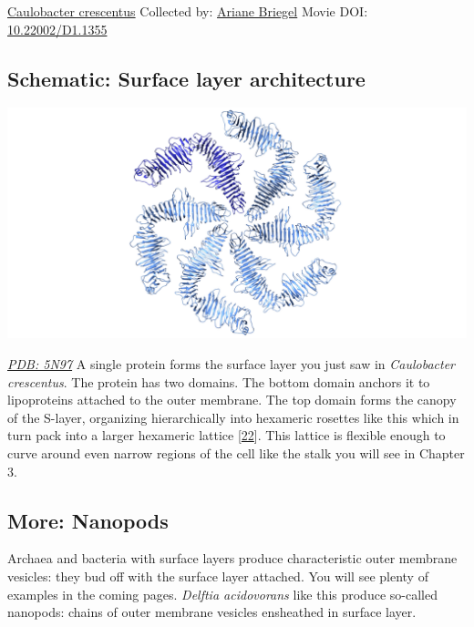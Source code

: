 \documentclass[]{tufte-book}
\begin{document}
\hypertarget{htmlwidget-324191a02fc7c81bfc07}{}

\label{fig:2-6}\protect\hyperlink{tree}{Caulobacter crescentus} Collected by: \protect\hyperlink{ariane_briegel}{Ariane Briegel} Movie DOI: \href{https://doi.org/10.22002/D1.1355}{10.22002/D1.1355}

\hypertarget{Surface_layer_architecture}{%
\subsection*{Schematic: Surface layer architecture}\label{Surface_layer_architecture}}

\includegraphics{img/schematics/2_6_1}

\href{http://rcsb.org/structure/5N97}{\emph{PDB: 5N97}}
A single protein forms the surface layer you just saw in \emph{Caulobacter crescentus}. The protein has two domains. The bottom domain anchors it to lipoproteins attached to the outer membrane. The top domain forms the canopy of the S-layer, organizing hierarchically into hexameric rosettes like this which in turn pack into a larger hexameric lattice {[}\protect\hyperlink{ref-bharat2017}{22}{]}. This lattice is flexible enough to curve around even narrow regions of the cell like the stalk you will see in Chapter 3.

\hypertarget{Nanopods}{%
\subsection*{More: Nanopods}\label{Nanopods}}

Archaea and bacteria with surface layers produce characteristic outer membrane vesicles: they bud off with the surface layer attached. You will see plenty of examples in the coming pages. \emph{Delftia acidovorans} like this produce so-called nanopods: chains of outer membrane vesicles ensheathed in surface layer.
\end{document}
